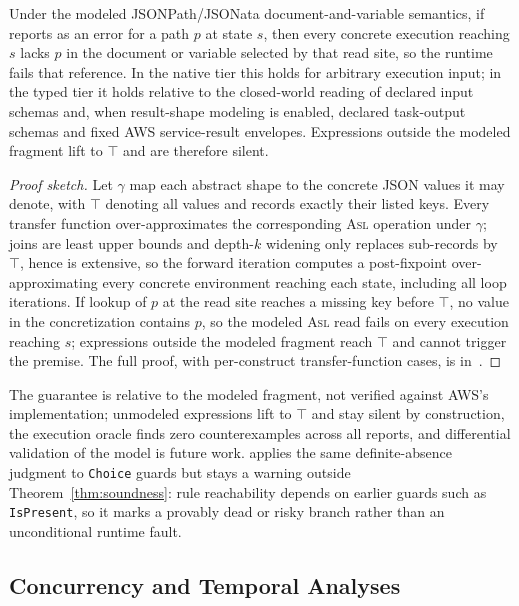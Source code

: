 \begin{theorem}\label{thm:soundness}
Under the modeled JSONPath/JSONata document-and-variable semantics, if \tool{} reports
 as an error for a path $p$ at state $s$, then every concrete execution reaching $s$ lacks $p$ in
the document or variable selected by that read site, so the \asl{} runtime fails that reference. In
the native tier this holds for arbitrary execution input; in the typed tier it holds relative to the
closed-world reading of declared input schemas and, when result-shape modeling is enabled, declared
task-output schemas and fixed AWS service-result envelopes. Expressions outside the modeled fragment
lift to $\top$ and are therefore silent.
\end{theorem}

\begin{proof}[Proof sketch]
Let $\gamma$ map each abstract shape to the concrete JSON values it may
denote, with $\top$ denoting all values and records exactly their listed
keys. Every transfer function over-approximates the corresponding
\textsc{Asl} operation under $\gamma$; joins are least upper bounds and
depth-$k$ widening only replaces sub-records by $\top$, hence is
extensive, so the forward iteration computes a post-fixpoint
over-approximating every concrete environment reaching each state,
including all loop iterations. If lookup of $p$ at the read site reaches
a missing key before $\top$, no value in the concretization contains
$p$, so the modeled \textsc{Asl} read fails on every execution reaching
$s$; expressions outside the modeled fragment reach $\top$ and cannot
trigger the premise. The full proof, with per-construct
transfer-function cases, is in~\cite{stepcheck-repo}.
\end{proof}
The guarantee is relative to the modeled fragment, not verified against
AWS's implementation; unmodeled expressions lift to $\top$ and stay silent
by construction, the execution oracle finds zero counterexamples across
all reports, and differential validation of the model is future work.
 applies the same definite-absence judgment
to \texttt{Choice} guards but stays a warning outside Theorem~\ref{thm:soundness}: rule
reachability depends on earlier guards such as \texttt{IsPresent}, so it marks a provably dead or
risky branch rather than an unconditional runtime fault.

\vspace{-0.25cm}
\subsection{Concurrency and Temporal Analyses}
\label{sec:approach:conservative}

